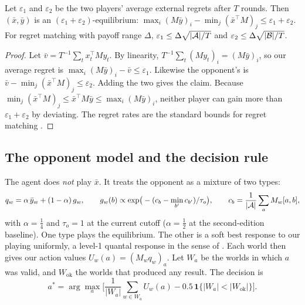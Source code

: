 \begin{proposition}
\label{prop:rm}
Let $\varepsilon_1$ and $\varepsilon_2$ be the two players' average external
regrets after $T$ rounds. Then $(\bar x,\bar y)$ is an
$(\varepsilon_1+\varepsilon_2)$-equilibrium:
$\max_i(M\bar y)_i-\min_j(\bar x^\top M)_j\le\varepsilon_1+\varepsilon_2$.
For regret matching with payoff range $\Delta$,
$\varepsilon_1\le\Delta\sqrt{|\mathcal{A}|/T}$ and $\varepsilon_2\le\Delta\sqrt{|\mathcal{B}|/T}$.
\end{proposition}
\begin{proof}
Let $\bar v=T^{-1}\sum_tx_t^\top My_t$. By linearity,
$T^{-1}\sum_t(My_t)_i=(M\bar y)_i$, so our average regret is
$\max_i(M\bar y)_i-\bar v\le\varepsilon_1$. Likewise the opponent's is
$\bar v-\min_j(\bar x^\top M)_j\le\varepsilon_2$. Adding the two gives the
claim. Because
$\min_j(\bar x^\top M)_j\le\bar x^\top M\bar y\le\max_i(M\bar y)_i$, neither
player can gain more than $\varepsilon_1+\varepsilon_2$ by deviating. The
regret rates are the standard bounds for regret matching
\citep{hartmascolell,zinkevich2007}.
\end{proof}


\subsection{The opponent model and the decision rule}
The agent does \emph{not} play $\bar x$. It treats the opponent as a mixture of
two types:
\begin{equation}
  q_w=\alpha\,\bar y_w+(1-\alpha)\,g_w,\qquad
  g_w(b)\propto\exp\!\big(-(c_b-\min_{b'}c_{b'})/\tau_o\big),\qquad
  c_b=\frac1{|\mathcal{A}|}\sum_aM_w[a,b],
\end{equation}
with $\alpha=\tfrac14$ and $\tau_o=1$ at the current cutoff
($\alpha=\tfrac12$ at the second-edition baseline). One type plays the equilibrium. The
other is a soft best response to our playing uniformly, a level-1 quantal
response in the sense of \citet{mckelvey1995}. Each world then gives our action
values $U_w(a)=(M_wq_w)_a$. Let $W_a$ be the worlds in which $a$ was valid, and
$W_{\mathrm{ok}}$ the worlds that produced any result. The decision is
\begin{equation}
  a^*=\arg\max_a\Big[\frac1{|W_a|}\sum_{w\in W_a}U_w(a)-0.5\,\mathbf 1\{|W_a|<|W_{\mathrm{ok}}|\}\Big].
  \label{eq:decision}
\end{equation}

